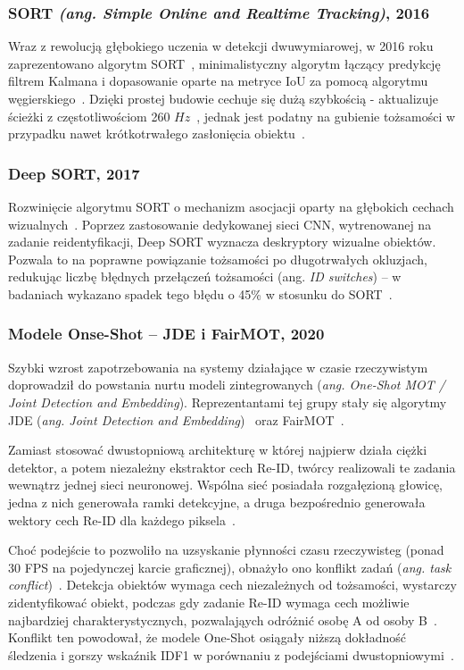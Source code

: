 \subsubsection{SORT \textit{(ang. Simple Online and Realtime Tracking)}, 2016}
Wraz z rewolucją głębokiego uczenia w detekcji dwuwymiarowej, w 2016 roku zaprezentowano algorytm SORT~\cite{bewley2016}, minimalistyczny algorytm łączący predykcję filtrem Kalmana i dopasowanie oparte na metryce IoU za
pomocą algorytmu węgierskiego~\cite{wojke2017}. Dzięki prostej budowie cechuje się dużą szybkością - aktualizuje
ścieżki z częstotliwościom 260 $Hz$~\cite{bewley2016}, jednak jest podatny na gubienie tożsamości w
przypadku nawet krótkotrwałego zasłonięcia obiektu~\cite{bewley2016, wojke2017}.

\subsubsection{Deep SORT, 2017}
Rozwinięcie algorytmu SORT o mechanizm asocjacji oparty na głębokich cechach
wizualnych~\cite{wojke2017}. Poprzez zastosowanie dedykowanej sieci CNN, wytrenowanej na zadanie
reidentyfikacji, Deep SORT wyznacza deskryptory wizualne obiektów. Pozwala to na poprawne
powiązanie tożsamości po długotrwałych okluzjach, redukując liczbę błędnych przełączeń tożsamości
(ang. \textit{ID switches}) – w badaniach wykazano spadek tego błędu o 45\% w stosunku do
SORT~\cite{wojke2017}.

\subsubsection{Modele Onse-Shot -- JDE i FairMOT, 2020}

Szybki wzrost zapotrzebowania na systemy działające w czasie rzeczywistym doprowadził do powstania
nurtu modeli zintegrowanych (\textit{ang. One-Shot MOT / Joint Detection and Embedding}).
Reprezentantami tej grupy stały się algorytmy JDE (\textit{ang. Joint Detection and
  Embedding})~\cite{wang2020jde} oraz FairMOT~\cite{zhang2021fairmot}.

Zamiast stosować dwustopniową architekturę w której najpierw działa ciężki detektor, a potem
niezależny ekstraktor cech Re-ID, twórcy realizowali te zadania wewnątrz jednej sieci neuronowej.
Wspólna sieć posiadała rozgałęzioną głowicę, jedna z nich generowała ramki detekcyjne, a druga
bezpośrednio generowała wektory cech Re-ID dla każdego piksela~\cite{zhang2021fairmot}.

Choć podejście to pozwoliło na uzsyskanie płynności czasu rzeczywisteg (ponad 30 FPS na pojedynczej
karcie graficznej), obnażyło ono konflikt zadań (\textit{ang. task
  conflict})~\cite{zhang2021fairmot, li2023rethinking}. Detekcja obiektów wymaga cech niezależnych od
tożsamości, wystarczy zidentyfikować obiekt, podczas gdy zadanie Re-ID wymaga cech możliwie
najbardziej charakterystycznych, pozwalająych odróżnić osobę A od osoby B~\cite{zhang2021fairmot}.
Konflikt ten powodował, że modele One-Shot osiągały niższą dokładność śledzenia i gorszy wskaźnik
IDF1 w porównaniu z podejściami dwustopniowymi~\cite{aharon2022, zhang2022}.

